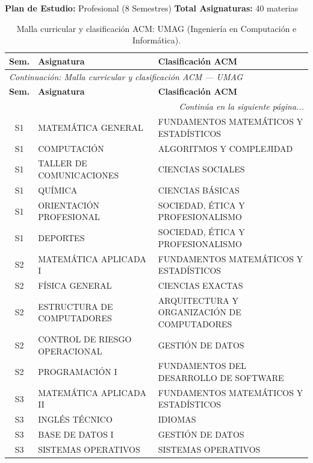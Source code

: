 \documentclass[11pt,a4paper]{article}
\begin{document}
\noindent\textbf{Plan de Estudio:} Profesional (8 Semestres) \hfill \textbf{Total Asignaturas:} 40 materias

\vspace{4pt}

\begin{small}
\begin{longtable}{c >{\raggedright\arraybackslash}p{8.5cm} >{\raggedright\arraybackslash}p{5.5cm}}
\caption{Malla curricular y clasificación ACM: UMAG (Ingeniería en Computación e Informática).} \label{tab:UMAG05} \\
\toprule
\textbf{Sem.} & \textbf{Asignatura} & \textbf{Clasificación ACM} \\
\midrule
\endfirsthead
\multicolumn{3}{l}{\small\textit{Continuación: Malla curricular y clasificación ACM --- UMAG}} \\[3pt]
\toprule
\textbf{Sem.} & \textbf{Asignatura} & \textbf{Clasificación ACM} \\
\midrule
\endhead
\midrule
\multicolumn{3}{r}{\small\textit{Continúa en la siguiente página...}} \\
\endfoot
\bottomrule
\endlastfoot
S1 & MATEMÁTICA GENERAL & FUNDAMENTOS MATEMÁTICOS Y ESTADÍSTICOS \\
S1 & COMPUTACIÓN & ALGORITMOS Y COMPLEJIDAD \\
S1 & TALLER DE COMUNICACIONES & CIENCIAS SOCIALES \\
S1 & QUÍMICA & CIENCIAS BÁSICAS \\
S1 & ORIENTACIÓN PROFESIONAL & SOCIEDAD, ÉTICA Y PROFESIONALISMO \\
S1 & DEPORTES & SOCIEDAD, ÉTICA Y PROFESIONALISMO \\
S2 & MATEMÁTICA APLICADA I & FUNDAMENTOS MATEMÁTICOS Y ESTADÍSTICOS \\
S2 & FÍSICA GENERAL & CIENCIAS EXACTAS \\
S2 & ESTRUCTURA DE COMPUTADORES & ARQUITECTURA Y ORGANIZACIÓN DE COMPUTADORES \\
S2 & CONTROL DE RIESGO OPERACIONAL & GESTIÓN DE DATOS \\
S2 & PROGRAMACIÓN I & FUNDAMENTOS DEL DESARROLLO DE SOFTWARE \\
S3 & MATEMÁTICA APLICADA II & FUNDAMENTOS MATEMÁTICOS Y ESTADÍSTICOS \\
S3 & INGLÉS TÉCNICO & IDIOMAS \\
S3 & BASE DE DATOS I & GESTIÓN DE DATOS \\
S3 & SISTEMAS OPERATIVOS & SISTEMAS OPERATIVOS \\

\end{longtable}
\end{small}
\end{document}
